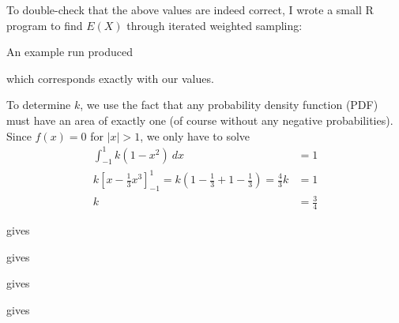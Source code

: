 \documentclass[a4paper,english,12pt]{article}
\begin{document}
To double-check that the above values are indeed correct, I wrote a small R
program to find $E(X)$ through iterated weighted sampling:


An example run produced

which corresponds exactly with our values.


To determine $k$, we use the fact that any probability density function (PDF)
must have an area of exactly one (of course without any negative
probabilities). Since $f(x) = 0$ for $|x| > 1$, we only have to solve
\begin{align*}
  \int_{-1}^{1}{k(1-x^2)~dx} &= 1 \\
  k\left[ x - \frac{1}{3}{x^3} \right]_{-1}^{1} =
  k\left( 1 - \frac{1}{3} + 1 - \frac{1}{3} \right) = \frac{4}{3}k &= 1 \\
   k &= \frac{3}{4}
\end{align*}






\texttt{} gives
\texttt{}

\texttt{} gives
\texttt{}

 gives
\texttt{}

\texttt{} gives
\texttt{}

\end{document}
